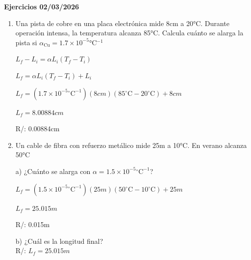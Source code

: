 \documentclass[a4paper, 11pt]{article}
\newcommand{\Pspace}{0.5cm}
\newcommand{\Aspace}{0.2cm}
\begin{document}
    \newpage
    {\Large \textbf{Ejercicios 02/03/2026}}
    \begin{enumerate}
    \vspace{\Pspace}
    \item Una pista de cobre en una placa electrónica mide 8cm a 20°C. Durante operación intensa, la temperatura alcanza 85°C. Calcula cuánto se alarga la pista si $\alpha_{\text{Cu}} = 1.7 \times 10^{-5}$°C$^{-1}$ \par
        \vspace{\Aspace} \par
        { \color{azul}  
            $L_{f} - L_{i} = \alpha L_{i} (T_{f} - T_{i})$ \par
            $L_{f} = \alpha L_{i} (T_{f} - T_{i}) + L_{i}$ \par
            $L_{f} = (1.7 \times 10^{-5}\mathrm{^\circ C^{-1}})(8cm)(85\mathrm{^\circ C} - 20\mathrm{^\circ C}) + 8cm$ \par
            $L_{f} = 8.00884cm$ \par
            R/: 0.00884cm
        }



    \vspace{\Pspace}
    \item Un cable de fibra con refuerzo metálico mide 25m a 10°C. En verano alcanza 50°C \par
        \vspace{\Aspace} \par
        a) ¿Cuánto se alarga con $\alpha = 1.5 \times 10^{-5}\mathrm{^\circ C^{-1}}$?
        \\ { \color{azul} 
            $L_{f} = (1.5 \times 10^{-5}\mathrm{^\circ C^{-1}})(25m)(50\mathrm{^\circ C} - 10\mathrm{^\circ C}) + 25m$ \par
            $L_{f} = 25.015m$ \par
            R/: 0.015m
        }

        \vspace{\Aspace} \par
        b) ¿Cuál es la longitud final?
        \\ { \color{azul} 
            R/: $L_{f} = 25.015m$
        }




\end{enumerate}
\end{document}
